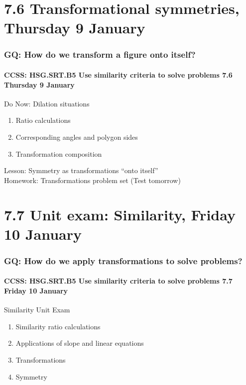 \documentclass{beamer}
\begin{document}
\section{7.6 Transformational symmetries, Thursday 9 January}
\frame
{
  \frametitle{GQ: How do we transform a figure onto itself?}
  \framesubtitle{CCSS: HSG.SRT.B5 Use similarity criteria to solve problems \hfill \alert{7.6 Thursday 9 January}}

  \begin{block}{Do Now: Dilation situations}
  \begin{enumerate}
    \item Ratio calculations
    \item Corresponding angles and polygon sides
    \item Transformation composition
  \end{enumerate}
  \end{block}
  Lesson: Symmetry as transformations ``onto itself'' \\[0.5cm]
  Homework: Transformations problem set (\alert{Test tomorrow})
}

\section{7.7 Unit exam: Similarity, Friday 10 January}
\frame
{
  \frametitle{GQ: How do we apply transformations to solve problems?}
  \framesubtitle{CCSS: HSG.SRT.B5 Use similarity criteria to solve problems \hfill \alert{7.7 Friday 10 January}}

  \begin{block}{Similarity Unit Exam}
  \begin{enumerate}
    \item Similarity ratio calculations
    \item Applications of slope and linear equations
    \item Transformations
    \item Symmetry
  \end{enumerate}
  \end{block}
}
\end{document}
